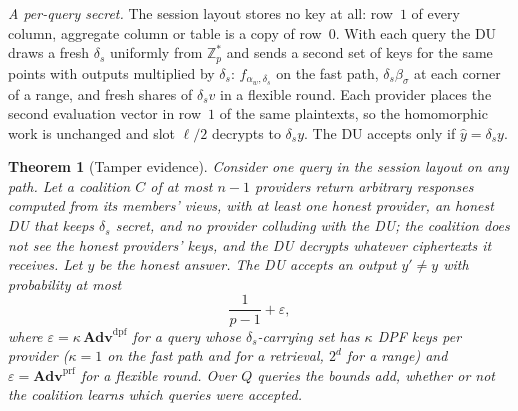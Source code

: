 \documentclass[a4paper,fleqn]{cas-sc}
\newtheorem{theorem}{Theorem}
\newcommand{\advPRF}{\mathbf{Adv}^{\mathrm{prf}}}
\newcommand{\advDPF}{\mathbf{Adv}^{\mathrm{dpf}}}
\begin{document}
\emph{A per-query secret.} The session layout stores no key at all: row~$1$ of
every column, aggregate column or table is a copy of row~$0$. With each query
the DU draws a fresh $\delta_s$ uniformly from $\mathbb{Z}_p^{*}$ and sends a
second set of keys for the same points with outputs multiplied by $\delta_s$:
$f_{\alpha_w,\delta_s}$ on the fast path, $\delta_s\beta_\sigma$ at each corner
of a range, and fresh shares of $\delta_s v$ in a flexible round. Each provider
places the second evaluation vector in row~$1$ of the same plaintexts, so the
homomorphic work is unchanged and slot $\ell/2$ decrypts to $\delta_s y$. The
DU accepts only if $\hat y=\delta_s y$.

\begin{theorem}[Tamper evidence]
\label{thm:tamper}
Consider one query in the session layout on any path. Let a coalition $C$ of at
most $n-1$ providers return arbitrary responses computed from its members'
views, with at least one honest provider, an honest DU that keeps $\delta_s$
secret, and no provider colluding with the DU; the coalition does not see the
honest providers' keys, and the DU decrypts whatever ciphertexts it receives.
Let $y$ be the honest answer. The DU accepts an output $y'\neq y$ with probability at most
\[
\frac{1}{p-1}+\varepsilon,
\]
where $\varepsilon=\kappa\,\advDPF$ for a query whose $\delta_s$-carrying set
has $\kappa$ DPF keys per provider ($\kappa=1$ on the fast path and for a
retrieval, $2^d$ for a range) and $\varepsilon=\advPRF$ for a flexible round. Over $Q$ queries the
bounds add, whether or not the coalition learns which queries were accepted.
\end{theorem}
\end{document}
